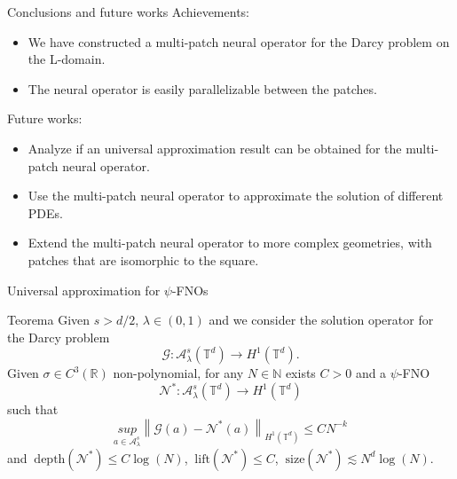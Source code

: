 \documentclass{beamer}
\newcommand{\numberset}{\mathbb}
\newcommand{\N}{\numberset{N}}
\newcommand{\R}{\numberset{R}}
\begin{document}
\begin{frame}{Conclusions and future works}
	Achievements:
	\begin{itemize}
		\item We have constructed a multi-patch neural operator for the Darcy problem on the L-domain.
		\item The neural operator is easily parallelizable between the patches.
	\end{itemize}
	\pause
	Future works:
	\begin{itemize}
		\item Analyze if an universal approximation result can be obtained for the multi-patch neural operator.
		\item Use the multi-patch neural operator to approximate the solution of different PDEs.
		\item Extend the multi-patch neural operator to more complex geometries, with patches that are isomorphic to the square.
	\end{itemize}
\end{frame}

\backmatter %


\appendix
\begin{frame}[noframenumbering]{Universal approximation for $\psi$-FNOs}
	\begin{themedTitleBlock}{Teorema} %
		Given $ s > d/2 $, $ \lambda \in (0,1) $ and we consider the solution operator for the Darcy problem 
		\[ \mathcal{G}: \mathcal{A}_{\lambda}^{s}(\mathbb{T}^d) \to H^1(\mathbb{T}^d). \]
		Given $ \sigma \in C^3(\R) $ non-polynomial, for any $ N \in \N $ exists $ C > 0 $ and a $ \psi $-FNO
		\[ \mathcal{N}^{*}: \mathcal{A}_{\lambda}^{s}(\mathbb{T}^d) \to H^1(\mathbb{T}^d)  \]
		such that	
		\[ \underset{a \in \mathcal{A}_{\lambda}^{s}}{sup} \left\| \mathcal{G}(a) - \mathcal{N}^{*}(a) \right\|_{H^1(\mathbb{T}^d)} \le CN^{-k} \]
		and $\ \mathrm{depth}(\mathcal{N}^{*}) \le C \log(N) $, $\  \mathrm{lift}(\mathcal{N}^{*}) \le C $, $\ \mathrm{size}(\mathcal{N}^{*}) \lesssim N^d\log(N). $
	\end{themedTitleBlock}
\end{frame}

\end{document}
